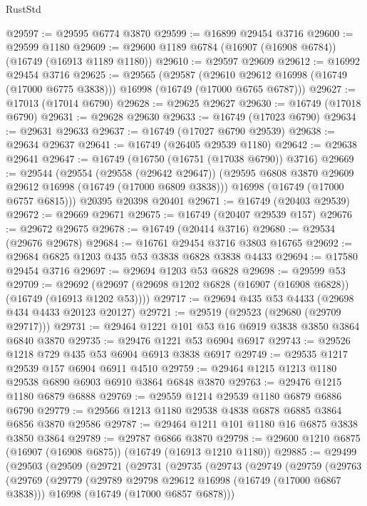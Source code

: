 \begin{lexlean}{RustStd}
\begin{coremodule}
@29597 := @29595 @6774 @3870
@29599 := @16899 @29454 @3716
@29600 := @29599 @1180
@29609 := @29600 @1189 @6784 (@16907 (@16908 @6784)) (@16749 (@16913 @1189 @1180))
@29610 := @29597 @29609
@29612 := @16992 @29454 @3716
@29625 := @29565
    (@29587
      (@29610 @29612 @16998 (@16749 (@17000 @6775 @3838)))
      @16998
      (@16749 (@17000 @6765 @6787)))
@29627 := @17013 (@17014 @6790)
@29628 := @29625 @29627
@29630 := @16749 (@17018 @6790)
@29631 := @29628 @29630
@29633 := @16749 (@17023 @6790)
@29634 := @29631 @29633
@29637 := @16749 (@17027 @6790 @29539)
@29638 := @29634 @29637
@29641 := @16749 (@26405 @29539 @1180)
@29642 := @29638 @29641
@29647 := @16749 (@16750 (@16751 (@17038 @6790)) @3716)
@29669 := @29544
    (@29554
      (@29558 (@29642 @29647))
      (@29595 @6808 @3870 @29609 @29612 @16998 (@16749 (@17000 @6809 @3838)))
      @16998
      (@16749 (@17000 @6757 @6815)))
    @20395
    @20398
    @20401
@29671 := @16749 (@20403 @29539)
@29672 := @29669 @29671
@29675 := @16749 (@20407 @29539 @157)
@29676 := @29672 @29675
@29678 := @16749 (@20414 @3716)
@29680 := @29534 (@29676 @29678)
@29684 := @16761 @29454 @3716 @3803 @16765
@29692 := @29684 @6825 @1203 @435 @53 @3838 @6828 @3838 @4433
@29694 := @17580 @29454 @3716
@29697 := @29694 @1203 @53 @6828
@29698 := @29599 @53
@29709 := @29692 (@29697 (@29698 @1202 @6828 (@16907 (@16908 @6828)) (@16749 (@16913 @1202 @53))))
@29717 := @29694 @435 @53 @4433 (@29698 @434 @4433 @20123 @20127)
@29721 := @29519 (@29523 (@29680 (@29709 @29717)))
@29731 := @29464 @1221 @101 @53 @16 @6919 @3838 @3850 @3864 @6840 @3870
@29735 := @29476 @1221 @53 @6904 @6917
@29743 := @29526 @1218 @729 @435 @53 @6904 @6913 @3838 @6917
@29749 := @29535 @1217 @29539 @157 @6904 @6911 @4510
@29759 := @29464 @1215 @1213 @1180 @29538 @6890 @6903 @6910 @3864 @6848 @3870
@29763 := @29476 @1215 @1180 @6879 @6888
@29769 := @29559 @1214 @29539 @1180 @6879 @6886 @6790
@29779 := @29566 @1213 @1180 @29538 @4838 @6878 @6885 @3864 @6856 @3870 @29586
@29787 := @29464 @1211 @101 @1180 @16 @6875 @3838 @3850 @3864
@29789 := @29787 @6866 @3870
@29798 := @29600 @1210 @6875 (@16907 (@16908 @6875)) (@16749 (@16913 @1210 @1180))
@29885 := @29499
    (@29503
      (@29509
        (@29721
          (@29731
            (@29735
              (@29743
                (@29749
                  (@29759
                    (@29763
                      (@29769
                        (@29779
                          (@29789 @29798 @29612 @16998 (@16749 (@17000 @6867 @3838)))
                          @16998
                          (@16749 (@17000 @6857 @6878)))

\end{coremodule}
\end{lexlean}
